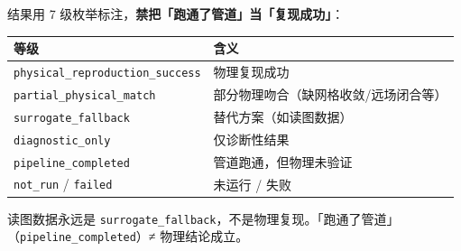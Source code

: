 结果用 7 级枚举标注，\textbf{禁把「跑通了管道」当「复现成功」}：

\begin{table}[H]
\centering\small
\begin{tabular}{@{}ll@{}}
\toprule
等级 & 含义 \\
\midrule
\texttt{physical\_reproduction\_success} & 物理复现成功 \\
\texttt{partial\_physical\_match} & 部分物理吻合（缺网格收敛/远场闭合等） \\
\texttt{surrogate\_fallback} & 替代方案（如读图数据） \\
\texttt{diagnostic\_only} & 仅诊断性结果 \\
\texttt{pipeline\_completed} & 管道跑通，但物理未验证 \\
\texttt{not\_run} / \texttt{failed} & 未运行 / 失败 \\
\bottomrule
\end{tabular}
\end{table}

读图数据永远是 \texttt{surrogate\_fallback}，不是物理复现。「跑通了管道」（\texttt{pipeline\_completed}）≠ 物理结论成立。
